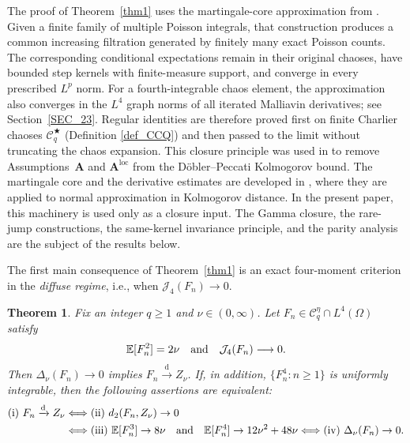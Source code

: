 \documentclass[letterpaper,11pt,reqno]{amsart}
\numberwithin{equation}{section}
\theoremstyle{plain}
\newtheorem{theorem}{Theorem}[section]
\theoremstyle{definition}
\theoremstyle{remark}
\newcommand{\E}{\mathbb{E}}
\newcommand{\cC}{\mathcal{C}}
\newcommand{\noi}{\noindent}
\newcommand{\Jfour}{\mathcal J_4}
\newcommand{\Del}{\Delta}
\newcommand{\AND}{\quad{\rm and}\quad}
\begin{document}
The proof of Theorem~\ref{thm1} uses the martingale-core approximation
from \cite{Zhe26a}.  Given a finite family of multiple Poisson
integrals, that construction produces a common increasing filtration
generated by finitely many exact Poisson counts.  The corresponding
conditional expectations remain in their original chaoses, have
bounded step kernels with finite-measure support, and converge in every
prescribed $L^p$ norm.  For a fourth-integrable chaos element, the
approximation also converges in the $L^4$ graph norms of all iterated
Malliavin derivatives; see Section~\ref{SEC_23}.  Regular identities
are therefore proved first on finite Charlier chaoses $\cC^\bigstar_q$
(Definition \ref{def_CCQ})
and then passed
to the limit without truncating the chaos expansion.  This closure principle was used in
\cite[Theorem~1.9]{Zhe26a} to remove Assumptions~$\mathbf A$ and
$\mathbf A^{\mathrm{loc}}$ from the D\"obler--Peccati Kolmogorov
bound.  The martingale core and the derivative estimates are developed
in \cite{Zhe26a}, where they are applied to normal approximation in
Kolmogorov distance.  In the present paper, this machinery is used only
as a closure input.  The Gamma closure, the rare-jump constructions,
the same-kernel invariance principle, and the parity analysis are the
subject of the results below.

The first main consequence of Theorem~\ref{thm1} is an
exact four-moment criterion in the \emph{diffuse regime}, i.e.,
when $\Jfour(F_n)\to0$.

\begin{theorem}
\label{thm2}
Fix an integer $q\geq1$ and $\nu\in(0,\infty)$.  Let
$F_n\in\cC_q^\eta\cap L^4(\Omega)$ satisfy
\noi
\begin{align}
 \E[F_n^2]=2\nu
\AND
 \Jfour(F_n)\longrightarrow0.
 \label{diff_ass}
\end{align}
Then $\Del_\nu(F_n)\to0$ implies $F_n\xrightarrow{\mathrm d}Z_\nu$.
If, in addition, $\{F_n^4:n\geq1\}$ is uniformly integrable, then the
following assertions are equivalent:
\begin{align*}
\begin{aligned}
 {\rm(i)}\ F_n\xrightarrow{\mathrm d}Z_\nu
 &\Longleftrightarrow {\rm(ii)}\ d_2(F_n,Z_\nu)\to0\\
 &\Longleftrightarrow {\rm(iii)}\ \E[F_n^3]\to8\nu
 \AND \E[F_n^4]\to12\nu^2+48\nu
 \Longleftrightarrow {\rm(iv)}\ \Del_\nu(F_n)\to0.
\end{aligned}
\end{align*}


\end{theorem}
\end{document}
